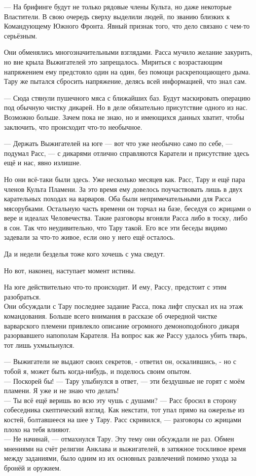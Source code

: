 \noindent --- На брифинге будут не только рядовые члены Культа, но даже 
некоторые Властители. В свою очередь сверху выделили людей, по званию близких к 
Командующему Южного Фронта. Явный признак того, что дело связано с чем-то 
серьёзным.

Они обменялись многозначительными взглядами. Расса мучило желание закурить, но 
вне крыла Выжигателей это запрещалось. Мириться с возрастающим напряжением ему 
предстояло один на один, без помощи раскрепощающего дыма. Тару же пытался 
сбросить напряжение, делясь всей информацией, что знал сам.

\noindent --- Сюда стянули пушечного мяса с ближайших баз. Будут маскировать 
операцию под обычную чистку дикарей. Но в деле обязательно присутствие одного из 
нас. Возможно больше. Зачем пока не знаю, но и имеющихся данных хватит, чтобы 
заключить, что происходит что-то необычное.

\noindent --- Держать Выжигателей на юге --- вот что уже необычно само по себе, 
--- подумал Расс, --- с дикарями отлично справляются Каратели и присутствие 
здесь ещё и нас, явно излишне.

Но они всё-таки были здесь. Уже несколько месяцев как. Расс, Тару и ещё пара 
членов Культа Пламени. За это время ему довелось поучаствовать лишь в двух 
карательных походах на варваров. Оба были непримечательными для Расса 
мясорубками. Остальную часть времени он торчал на базе, беседуя со жрицами о 
вере и идеалах Человечества. Такие разговоры вгоняли Расса либо в тоску, либо в 
сон. Так что неудивительно, что Тару такой. Его все эти беседы видимо задевали 
за что-то живое, если оно у него ещё осталось.

Да и недели безделья тоже кого хочешь с ума сведут.

Но вот, наконец, наступает момент истины.

На юге действительно что-то происходит. И ему, Рассу, предстоит с этим 
разобраться.\\
Они обсуждали с Тару последнее задание Расса, пока лифт спускал 
их на этаж командования. Больше всего внимания в рассказе об очередной чистке 
варварского племени привлекло описание огромного демоноподобного дикаря 
разорвавшего напополам Карателя. На вопрос как же Рассу удалось убить тварь, тот 
лишь ухмыльнулся.

\noindent --- Выжигатели не выдают своих секретов, - ответил он, оскалившись, - 
но с тобой я, может быть когда-нибудь, и поделюсь своим опытом.\\
--- Поскорей бы! --- Тару улыбнулся в ответ, --- эти бездушные не горят с моём 
пламени. Я уже и не знаю что делать!\\
--- Ты всё ещё веришь во всю эту чушь с душами? --- Расс бросил в сторону 
собеседника скептический взгляд. Как некстати, тот упал прямо на ожерелье из 
костей, болтавшееся на шее у Тару. Расс скривился, --- разговоры со жрицами 
плохо на тебя влияют.\\
--- Не начинай, ---  отмахнулся Тару. Эту тему они обсуждали не раз. Обмен 
мнениями на счёт религии Анклава и выжигателей, в затяжное тоскливое время 
между заданиями, было одним из их основных развлечений помимо ухода за бронёй и 
оружием.

